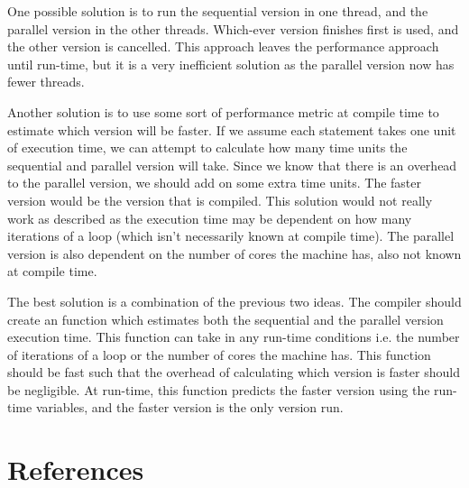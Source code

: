 \documentclass[conference]{IEEEtran}
\begin{document}
One possible solution is to run the sequential version in one thread, and the parallel version in the other threads. Which-ever version finishes first is used, and the other version is cancelled. This approach leaves the performance approach until run-time, but it is a very inefficient solution as the parallel version now has fewer threads.

Another solution is to use some sort of performance metric at compile time to estimate which version will be faster. If we assume each statement takes one unit of execution time, we can attempt to calculate how many time units the sequential and parallel version will take. Since we know that there is an overhead to the parallel version, we should add on some extra time units. The faster version would be the version that is compiled. This solution would not really work as described as the execution time may be dependent on how many iterations of a loop (which isn't necessarily known at compile time). The parallel version is also dependent on the number of cores the machine has, also not known at compile time.

The best solution is a combination of the previous two ideas. The compiler should create an function which estimates both the sequential and the parallel version execution time. This function can take in any run-time conditions i.e. the number of iterations of a loop or the number of cores the machine has. This function should be fast such that the overhead of calculating which version is faster should be negligible. At run-time, this function predicts the faster version using the run-time variables, and the faster version is the only version run.

\section{References}
\printbibliography[heading=none]
\end{document}
